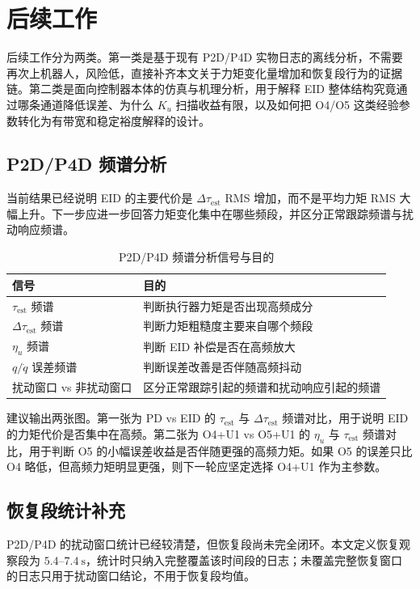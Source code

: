 \documentclass[12pt,a4paper]{ctexart}
\begin{document}
\section{后续工作}


后续工作分为两类。第一类是基于现有 P2D/P4D 实物日志的离线分析，不需要再次上机器人，风险低，直接补齐本文关于力矩变化量增加和恢复段行为的证据链。第二类是面向控制器本体的仿真与机理分析，用于解释 EID 整体结构究竟通过哪条通道降低误差、为什么 $K_u$ 扫描收益有限，以及如何把 O4/O5 这类经验参数转化为有带宽和稳定裕度解释的设计。

\subsection{P2D/P4D 频谱分析}

当前结果已经说明 EID 的主要代价是 $\Delta\tau_\mathrm{est}$ RMS 增加，而不是平均力矩 RMS 大幅上升。下一步应进一步回答力矩变化集中在哪些频段，并区分正常跟踪频谱与扰动响应频谱。

\begin{table}[htbp]
\centering
\footnotesize
\caption{P2D/P4D 频谱分析信号与目的}
\begin{tabularx}{\textwidth}{YY}
\toprule
信号 & 目的 \\
\midrule
$\tau_\mathrm{est}$ 频谱 & 判断执行器力矩是否出现高频成分 \\
$\Delta\tau_\mathrm{est}$ 频谱 & 判断力矩粗糙度主要来自哪个频段 \\
$\eta_u$ 频谱 & 判断 EID 补偿是否在高频放大 \\
$q/\dot q$ 误差频谱 & 判断误差改善是否伴随高频抖动 \\
扰动窗口 vs 非扰动窗口 & 区分正常跟踪引起的频谱和扰动响应引起的频谱 \\
\bottomrule
\end{tabularx}
\end{table}

建议输出两张图。第一张为 PD vs EID 的 $\tau_\mathrm{est}$ 与 $\Delta\tau_\mathrm{est}$ 频谱对比，用于说明 EID 的力矩代价是否集中在高频。第二张为 O4+U1 vs O5+U1 的 $\eta_u$ 与 $\tau_\mathrm{est}$ 频谱对比，用于判断 O5 的小幅误差收益是否伴随更强的高频力矩。如果 O5 的误差只比 O4 略低，但高频力矩明显更强，则下一轮应坚定选择 O4+U1 作为主参数。

\subsection{恢复段统计补充}

P2D/P4D 的扰动窗口统计已经较清楚，但恢复段尚未完全闭环。本文定义恢复观察段为 $5.4$--$7.4\ \mathrm{s}$，统计时只纳入完整覆盖该时间段的日志；未覆盖完整恢复窗口的日志只用于扰动窗口结论，不用于恢复段均值。
\end{document}
